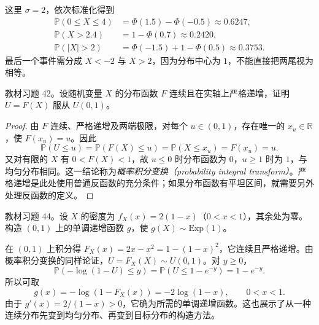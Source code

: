 \begin{solve}
这里 $\sigma=2$，依次标准化得到
\[
  \begin{aligned}
    \mathbb P(0\le X\le4)&=\Phi(1.5)-\Phi(-0.5)\approx0.6247,\\
    \mathbb P(X>2.4)&=1-\Phi(0.7)\approx0.2420,\\
    \mathbb P(|X|>2)&=\Phi(-1.5)+1-\Phi(0.5)\approx0.3753.
  \end{aligned}
\]
最后一个事件需分成 $X<-2$ 与 $X>2$，因为分布中心为 $1$，不能直接把两尾视为相等。
\end{solve}

\begin{example}
\label{ex:study-ch2-exercise-42}
教材习题 42。设随机变量 $X$ 的分布函数 $F$ 连续且在实轴上严格递增，证明 $U=F(X)$ 服从 $U(0,1)$。
\end{example}

\begin{proof}
由 $F$ 连续、严格递增及两端极限，对每个 $u\in(0,1)$，存在唯一的 $x_u\in\mathbb R$，使 $F(x_u)=u$。因此
\[
  \mathbb P(U\le u)=\mathbb P(F(X)\le u)
  =\mathbb P(X\le x_u)=F(x_u)=u.
\]
又对有限的 $X$ 有 $0<F(X)<1$，故 $u\le0$ 时分布函数为 $0$，$u\ge1$ 时为 $1$，与均匀分布相同。这一结论称为\emph{概率积分变换（probability integral transform）}。严格递增是此处使用普通反函数的充分条件；如果分布函数有平坦区间，就需要另外处理反函数的定义。
\end{proof}

\begin{example}
\label{ex:study-ch2-exercise-44}
教材习题 44。设 $X$ 的密度为 $f_X(x)=2(1-x)$（$0<x<1$），其余处为零。构造 $(0,1)$ 上的单调递增函数 $g$，使 $g(X)\sim\mathrm{Exp}(1)$。
\end{example}

\begin{solve}
在 $(0,1)$ 上积分得 $F_X(x)=2x-x^2=1-(1-x)^2$，它连续且严格递增。由概率积分变换的同样论证，$U=F_X(X)\sim U(0,1)$。对 $y\ge0$，
\[
  \mathbb P(-\log(1-U)\le y)
  =\mathbb P(U\le1-e^{-y})=1-e^{-y}.
\]
所以可取
\begin{equation}
  g(x)=-\log(1-F_X(x))=-2\log(1-x),\qquad0<x<1.
  \label{eq:study-exercise-44-transform}
\end{equation}
由于 $g'(x)=2/(1-x)>0$，它确为所需的单调递增函数。这也展示了从一种连续分布先变到均匀分布、再变到目标分布的构造方法。
\end{solve}





